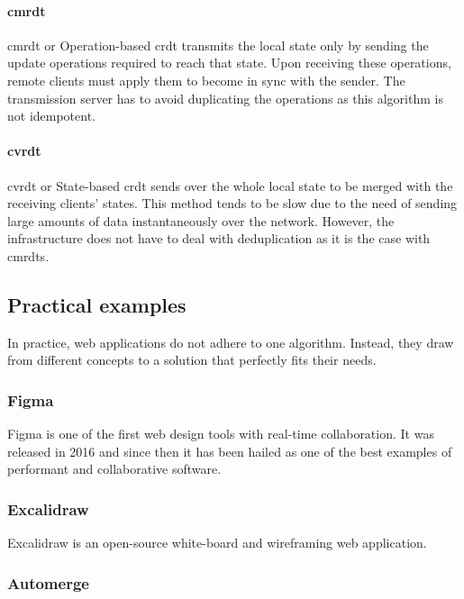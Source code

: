 \paragraph{\acrshort{cmrdt}}

\acrlong{cmrdt} or Operation-based \acrshort{crdt} transmits the local state only by sending the update operations required to reach that state.
Upon receiving these operations, remote clients must apply them to become in sync with the sender. The transmission server has to avoid duplicating the operations as this algorithm is not idempotent.

\paragraph{\acrshort{cvrdt}}

\acrlong{cvrdt} or State-based \acrshort{crdt} sends over the whole local state to be merged with the receiving clients' states. This method tends to be slow due to the need of sending large amounts of data instantaneously over the network. However, the infrastructure does not have to deal with deduplication as it is the case with \acrshort{cmrdt}s.

\subsection{Practical examples}

In practice, web applications do not adhere to one algorithm. Instead, they draw from different concepts to a solution that perfectly fits their needs.

\subsubsection{Figma}

Figma is one of the first web design tools with real-time collaboration.
It was released in 2016 and since then it has been hailed as one of the best examples of performant and collaborative software.


\subsubsection{Excalidraw}
Excalidraw is an open-source white-board and wireframing web application.

\subsubsection{Automerge}

